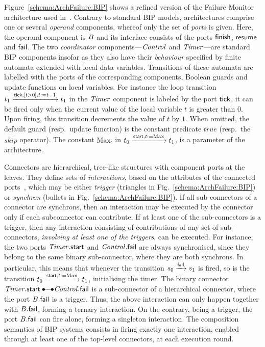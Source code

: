 \documentclass{lncs/llncs}
\newcommand{\mdash}{---}
\newcommand{\resp}[1][\ ]{resp.#1}
\newcommand{\goesto}[2][]{\ensuremath{\xrightarrow[#1]{#2}}}
\newcommand{\true}{\ensuremath{\mathit{true}}}
\begin{document}
Figure~\ref{schema:ArchFailure:BIP} shows a refined version of the
Failure Monitor architecture used in~\cite{CubETH-case-study}.
Contrary to standard BIP models, architectures comprise one or several
\emph{operand} components, whereof only the set of \emph{ports} is
given.  Here, the operand component is $B$ and its interface
consists of the ports $\mathsf{finish}$, $\mathsf{resume}$ and $\mathsf{fail}$.
The two \emph{coordinator} components\mdash $\mathit{Control}$ and
$\mathit{Timer}$\mdash are standard BIP components insofar as they also
have their \emph{behaviour} specified by finite automata extended with
local data variables.  Transitions of these automata are labelled with
the ports of the corresponding components, Boolean guards and update
functions on local variables.  For instance the loop transition
$\tstate{1} \goesto{\PortTick, \GuardTick[], \TimerUpd[]} \tstate{1}$
in the $\mathit{Timer}$ component is labeled by the port $\mathsf{tick}$, it
can be fired only when the current value of the local variable $t$ is
greater than $0$.  Upon firing, this transition decrements the value
of $t$ by $1$.  When omitted, the default guard (\resp update
function) is the constant predicate $\true$ (\resp the $\mathit{skip}$
operator).  The constant $\mathrm{Max}$, in $\tstate{0}
\goesto{\PortStart, \TimerInit[]} \tstate{1}$, is a parameter of the
architecture.

Connectors are hierarchical, tree-like structures with component ports
at the leaves.  They define sets of \emph{interactions}, based on the
attributes of the connected ports~\cite{BliSif08-acp-tc}, which may be
either \emph{trigger} (triangles in Fig.~\ref{schema:ArchFailure:BIP})
or \emph{synchron} (bullets in Fig.~\ref{schema:ArchFailure:BIP}).
%
If all sub-connectors of a connector are synchrons, then an
interaction may be executed by the connector only if each subconnector
can contribute.
%
If at least one of the sub-connectors is a trigger, then any
interaction consisting of contributions of any set of sub-connectors,
\emph{involving at least one of the triggers}, can be executed.
%
For instance, the two ports $\mathit{Timer}.\mathsf{start}$ and
$\mathit{Control}.\mathsf{fail}$ are always synchronised, since they belong to
the same binary sub-connector, where they are both synchrons.  In
particular, this means that whenever the transition $\cstate{0}
\goesto{\PortFail} \cstate{1}$ is fired, so is the transition
$\tstate{0} \goesto{\PortStart, \TimerInit[]} \tstate{1}$,
initialising the timer.  The binary connector $\NameTimer.\PortStart
\bullet\!\!\!-\!\!\!-\!\!\!\bullet \NameCtrl.\PortFail$ is a
sub-connector of a hierarchical connector, where the port
$B.\mathsf{fail}$ is a trigger.  Thus, the above interaction can
only happen together with $B.\mathsf{fail}$, forming a
ternary interaction.  On the contrary, being a trigger, the port
$B.\mathsf{fail}$ can fire alone, forming a singleton
interaction.  The composition semantics of BIP systems consists in
firing exactly one interaction, enabled through at least one of the
top-level connectors, at each execution round.
\end{document}
